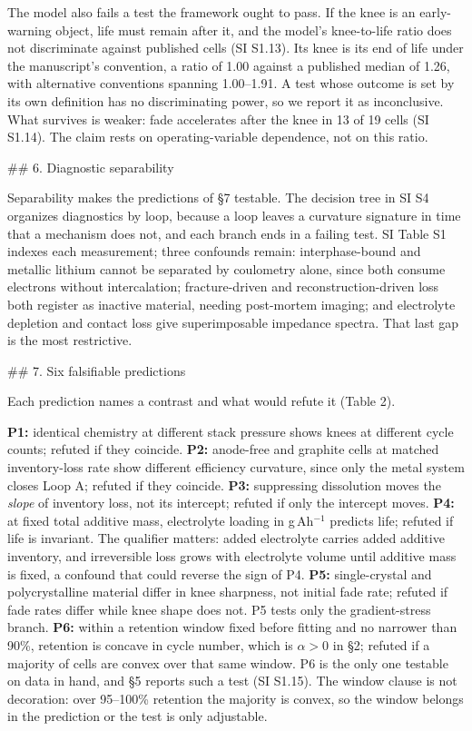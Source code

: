 The model also fails a test the framework ought to pass. If the knee is an early-warning object, life must remain after it, and the model's knee-to-life ratio does not discriminate against published cells (SI S1.13). Its knee is its end of life under the manuscript's convention, a ratio of 1.00 against a published median of 1.26, with alternative conventions spanning 1.00--1.91. A test whose outcome is set by its own definition has no discriminating power, so we report it as inconclusive. What survives is weaker: fade accelerates after the knee in 13 of 19 cells (SI S1.14). The claim rests on operating-variable dependence, not on this ratio.

## 6. Diagnostic separability

Separability makes the predictions of \S7 testable. The decision tree in SI S4 organizes diagnostics by loop, because a loop leaves a curvature signature in time that a mechanism does not, and each branch ends in a failing test.\cite{prosser2021lithium,costa2022battery,gunnarsdottir2020noninvasive} SI Table S1 indexes each measurement; three confounds remain: interphase-bound and metallic lithium cannot be separated by coulometry alone, since both consume electrons without intercalation;\cite{mcshane2020quantification} fracture-driven and reconstruction-driven loss both register as inactive material, needing post-mortem imaging; and electrolyte depletion and contact loss give superimposable impedance spectra. That last gap is the most restrictive.

## 7. Six falsifiable predictions

Each prediction names a contrast and what would refute it (Table 2).

\textbf{P1:} identical chemistry at different stack pressure shows knees at different cycle counts; refuted if they coincide.\cite{wang2026interplay,barai2017effect} \textbf{P2:} anode-free and graphite cells at matched inventory-loss rate show different efficiency curvature, since only the metal system closes Loop A; refuted if they coincide.\cite{louli2019exploring} \textbf{P3:} suppressing dissolution moves the \emph{slope} of inventory loss, not its intercept; refuted if only the intercept moves. \textbf{P4:} at fixed total additive mass, electrolyte loading in g\,Ah$^{-1}$ predicts life; refuted if life is invariant. The qualifier matters: added electrolyte carries added additive inventory, and irreversible loss grows with electrolyte volume until additive mass is fixed, a confound that could reverse the sign of P4.\cite{lechtenfeld2024electrolyte} \textbf{P5:} single-crystal and polycrystalline material differ in knee sharpness, not initial fade rate; refuted if fade rates differ while knee shape does not.\cite{wheatcroft2024situ} P5 tests only the gradient-stress branch. \textbf{P6:} within a retention window fixed before fitting and no narrower than 90\%, retention is concave in cycle number, which is $\alpha > 0$ in \S2; refuted if a majority of cells are convex over that same window. P6 is the only one testable on data in hand, and \S5 reports such a test (SI S1.15). The window clause is not decoration: over 95--100\% retention the majority is convex, so the window belongs in the prediction or the test is only adjustable.

